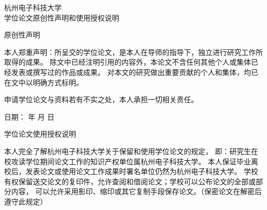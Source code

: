   {
    \vspace*{-12\p@}
    \begin{center}
      \large
      杭州电子科技大学\\[1ex] 学位论文原创性声明和使用授权说明
    \end{center}
    \vspace*{20\p@}
    \begin{center}
      \semilarge 原创性声明
    \end{center}
    \par \vspace*{.4\baselineskip}
    \begin{spacing}{1.65}
      本人郑重声明：所呈交的学位论文，是本人在导师的指导下，独立进行研究工作所取得的成果。
      除文中已经注明引用的内容外，本论文不含任何其他个人或集体已经发表或撰写过的作品或成果。
      对本文的研究做出重要贡献的个人和集体，均已在文中以明确方式标明。\par
      \noindent 申请学位论文与资料若有不实之处，本人承担一切相关责任。
      \par \vspace*{1.25\baselineskip}
      \noindent {}
      日期：
       年
       月
       日
      \par\vspace*{20\p@}
      \begin{center}
        \semilarge 学位论文使用授权说明
      \end{center}
      \par \vspace*{.4\baselineskip}
      本人完全了解杭州电子科技大学关于保留和使用学位论文的规定，
      即：研究生在校攻读学位期间论文工作的知识产权单位属杭州电子科技大学。
      本人保证毕业离校后，发表论文或使用论文工作成果时署名单位仍然为杭州电子科技大学。
      学校有权保留送交论文的复印件，允许查阅和借阅论文；学校可以公布论文的全部或部分内容，
      可以允许采用影印、缩印或其它复制手段保存论文。（保密论文在解密后遵守此规定）
      \par \vspace*{1.25\baselineskip}

\end{spacing}}
